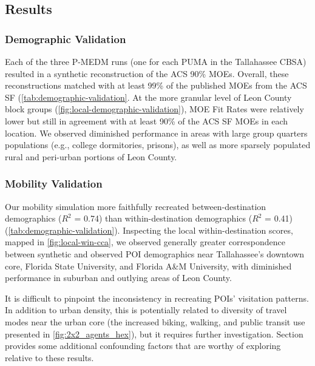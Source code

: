 \subsection{Results}\label{section:results}

\subsubsection{Demographic Validation}





Each of the three P-MEDM runs (one for each PUMA in the Tallahassee CBSA) resulted in a synthetic reconstruction of the ACS 90\% MOEs. Overall, these reconstructions matched with at least 99\% of the published MOEs from the ACS SF (\autoref{tab:demographic-validation}. At the more granular level of Leon County block groups (\autoref{fig:local-demographic-validation}), MOE Fit Rates were relatively lower but still in agreement with at least 90\% of the ACS SF MOEs in each location. We observed diminished performance in areas with large group quarters populations (e.g., college dormitories, prisons), as well as more sparsely populated rural and peri-urban portions of Leon County.

\subsubsection{Mobility Validation}

Our mobility simulation more faithfully recreated between-destination demographics ($R^2$ = 0.74) than within-destination demographics ($R^2$ = 0.41) (\autoref{tab:demographic-validation}). Inspecting the local within-destination scores, mapped in \autoref{fig:local-win-cca}, we observed generally greater correspondence between synthetic and observed POI demographics near Tallahassee's downtown core, Florida State University, and Florida A\&M University, with diminished performance in suburban and outlying areas of Leon County.



It is difficult to pinpoint the inconsistency in recreating POIs' visitation patterns. In addition to urban density, this is potentially related to diversity of travel modes near the urban core (the increased biking, walking, and public transit use presented in \autoref{fig:2x2_agents_hex}), but it requires further investigation. Section~ provides some additional confounding factors that are worthy of exploring relative to these results.

